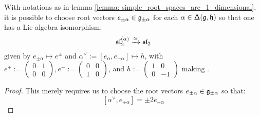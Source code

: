         \begin{corollary}[$\sl_2$-triples] \label{coro: sl_2_triples}
            With notations as in lemma \ref{lemma: simple_root_spaces_are_1_dimensional}, it is possible to choose root vectors $e_{\pm \alpha} \in \g_{\pm \alpha}$ for each $\alpha \in \simpleroots(\g, \h)$ so that one has a Lie algebra isomorphism:
                \begin{equation} \label{equation: sl_2_triples}
                    \sl_2^{(\alpha)} \xrightarrow[]{\cong} \sl_2
                \end{equation}
            given by $e_{\pm \alpha} \mapsto e^{\pm}$ and $\alpha^{\vee} := [e_{\alpha}, e_{-\alpha}] \mapsto h$, with $e^+ := \begin{pmatrix} 0 & 1 \\ 0 & 0 \end{pmatrix}, e^- := \begin{pmatrix} 0 & 0 \\ 1 & 0 \end{pmatrix}$, and $h := \begin{pmatrix} 1 & 0 \\ 0 & -1 \end{pmatrix}$ making .
        \end{corollary}
            \begin{proof}
                This merely requires us to choose the root vectors $e_{\pm \alpha} \in \g_{\pm \alpha}$ so that:
                    $$[\alpha^{\vee}, e_{\pm \alpha}] = \pm 2 e_{\pm \alpha}$$
            \end{proof}
        
